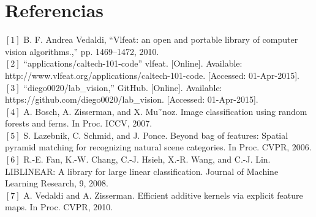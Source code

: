 \documentclass[10pt,twocolumn,letterpaper]{article}
\begin{document}
\section{Referencias}

$[1]$
B. F. Andrea Vedaldi, “Vlfeat: an open and portable library of computer vision algorithms.,” pp. 1469–1472, 2010.\\

\vspace{0.1 cm}
$[2]$
“applications/caltech-101-code” vlfeat. [Online]. Available: http://www.vlfeat.org/applications/caltech-101-code. [Accessed: 01-Apr-2015].\\

\vspace{0.1 cm}
$[3]$
“diego0020/lab\_vision,” GitHub. [Online]. Available: https://github.com/diego0020/lab\_vision. [Accessed: 01-Apr-2015].\\

\vspace{0.1 cm}
$[4]$
A. Bosch, A. Zisserman, and X. Mu˜noz. Image classification using random forests and ferns. In Proc. ICCV, 2007.
\\

\vspace{0.1 cm}
$[5]$
S. Lazebnik, C. Schmid, and J. Ponce. Beyond bag of features: Spatial pyramid matching for recognizing natural scene categories. In Proc. CVPR, 2006.\\

\vspace{0.1 cm}
$[6]$
R.-E. Fan, K.-W. Chang, C.-J. Hsieh, X.-R. Wang, and C.-J. Lin. LIBLINEAR: A library for large linear classification. Journal of Machine Learning Research, 9, 2008.\\

\vspace{0.1 cm}
$[7]$
A. Vedaldi and A. Zisserman. Efficient additive kernels via explicit feature maps. In Proc. CVPR, 2010.\\
\end{document}
